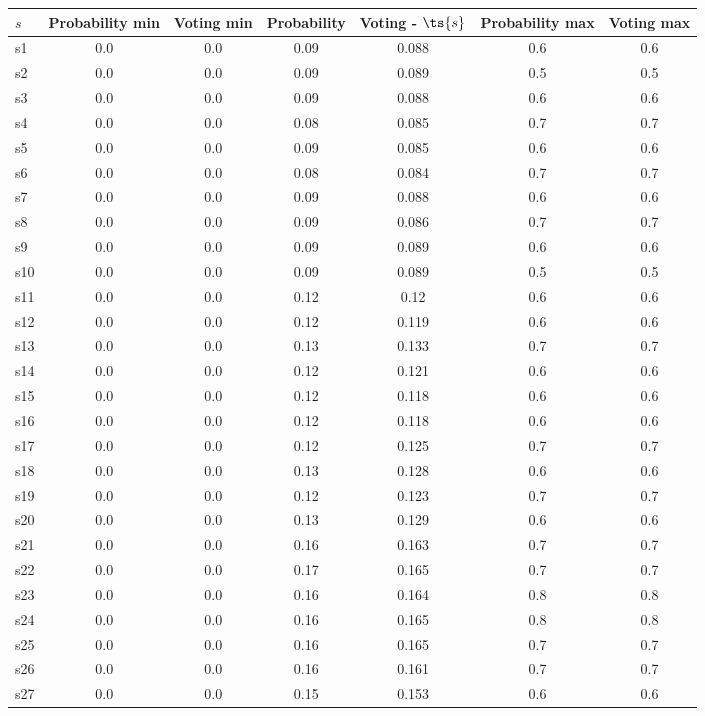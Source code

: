 \documentclass{article}
\begin{document}
\noindent\begin{tabular}{|l|c|c|c|c|c|c|}
\hline
$s$& Probability min & Voting min & Probability & Voting - $\ts{s}$ & Probability max & Voting max\\
\hline
s1 &0.0 & 0.0 & 0.09 & 0.088 & 0.6 & 0.6\\
\hline
s2 &0.0 & 0.0 & 0.09 & 0.089 & 0.5 & 0.5\\
\hline
s3 &0.0 & 0.0 & 0.09 & 0.088 & 0.6 & 0.6\\
\hline
s4 &0.0 & 0.0 & 0.08 & 0.085 & 0.7 & 0.7\\
\hline
s5 &0.0 & 0.0 & 0.09 & 0.085 & 0.6 & 0.6\\
\hline
s6 &0.0 & 0.0 & 0.08 & 0.084 & 0.7 & 0.7\\
\hline
s7 &0.0 & 0.0 & 0.09 & 0.088 & 0.6 & 0.6\\
\hline
s8 &0.0 & 0.0 & 0.09 & 0.086 & 0.7 & 0.7\\
\hline
s9 &0.0 & 0.0 & 0.09 & 0.089 & 0.6 & 0.6\\
\hline
s10 &0.0 & 0.0 & 0.09 & 0.089 & 0.5 & 0.5\\
\hline
s11 &0.0 & 0.0 & 0.12 & 0.12 & 0.6 & 0.6\\
\hline
s12 &0.0 & 0.0 & 0.12 & 0.119 & 0.6 & 0.6\\
\hline
s13 &0.0 & 0.0 & 0.13 & 0.133 & 0.7 & 0.7\\
\hline
s14 &0.0 & 0.0 & 0.12 & 0.121 & 0.6 & 0.6\\
\hline
s15 &0.0 & 0.0 & 0.12 & 0.118 & 0.6 & 0.6\\
\hline
s16 &0.0 & 0.0 & 0.12 & 0.118 & 0.6 & 0.6\\
\hline
s17 &0.0 & 0.0 & 0.12 & 0.125 & 0.7 & 0.7\\
\hline
s18 &0.0 & 0.0 & 0.13 & 0.128 & 0.6 & 0.6\\
\hline
s19 &0.0 & 0.0 & 0.12 & 0.123 & 0.7 & 0.7\\
\hline
s20 &0.0 & 0.0 & 0.13 & 0.129 & 0.6 & 0.6\\
\hline
s21 &0.0 & 0.0 & 0.16 & 0.163 & 0.7 & 0.7\\
\hline
s22 &0.0 & 0.0 & 0.17 & 0.165 & 0.7 & 0.7\\
\hline
s23 &0.0 & 0.0 & 0.16 & 0.164 & 0.8 & 0.8\\
\hline
s24 &0.0 & 0.0 & 0.16 & 0.165 & 0.8 & 0.8\\
\hline
s25 &0.0 & 0.0 & 0.16 & 0.165 & 0.7 & 0.7\\
\hline
s26 &0.0 & 0.0 & 0.16 & 0.161 & 0.7 & 0.7\\
\hline
s27 &0.0 & 0.0 & 0.15 & 0.153 & 0.6 & 0.6\\

\end{tabular}
\end{document}
